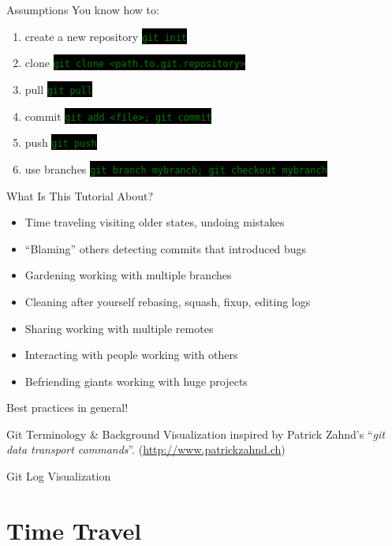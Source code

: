 \documentclass[
14pt,
aspectratio=169,
usenames,
dvipsnames,
x11names]{beamer}
\newcommand{\code}[1]{{\small\colorbox{black}{\textcolor{green}{\texttt{#1}}}}}
\newcommand{\buz}[2]{#1 \hfill \textcolor{Gray!50}{#2}}
\begin{document}
\begin{frame}{Assumptions}
  \alert{You} know how to:
  \begin{enumerate}
  \item create a new repository \hfill \code{git init}
  \item clone \hfill \code{git clone <path.to.git.repository>}
  \item pull \hfill \code{git pull}
  \item commit \hfill \code{git add <file>; git commit}
  \item push \hfill \code{git push}
  \item use branches \hfill \code{git branch mybranch; git checkout mybranch}
  \end{enumerate}
\end{frame}

\begin{frame}{What Is This Tutorial About?}
  \begin{itemize} \setlength{\itemsep}{\fill}
  \item \buz{Time traveling}{visiting older states, undoing mistakes}
  \item \buz{``Blaming'' others}{detecting commits that introduced bugs}
  \item \buz{Gardening}{working with multiple branches}
  \item \buz{Cleaning after yourself}{rebasing, squash, fixup, editing logs}
  \item \buz{Sharing}{working with multiple remotes}
  \item \buz{Interacting with people}{working with others}
  \item \buz{Befriending giants}{working with huge projects}
  \end{itemize}
  \centering
  \alert{Best practices} in general!
\end{frame}

\begin{frame}{Git Terminology \& Background}
  \centering
  \tiny
  Visualization inspired by Patrick Zahnd's ``\textit{git data transport commands}''. (\url{http://www.patrickzahnd.ch})
  \vfill
  \scriptsize
  
\end{frame}

\begin{frame}{Git Log Visualization}
  \centering
  
\end{frame}

\section{Time Travel}
\end{document}
